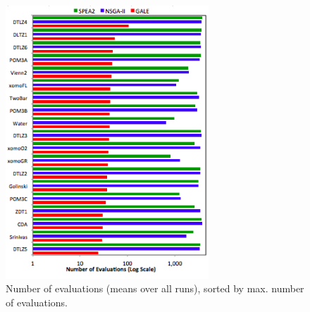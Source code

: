 \documentclass[10pt,journal,compsoc]{IEEEtran}
\begin{document}
\begin{figure}[!b]
\includegraphics[width=3in]{barcharts_numeval_v2.png}
\caption{Number of evaluations (means over all runs), sorted
by  max. number of evaluations.}\label{fig:evals} 
\end{figure}
\end{document}
